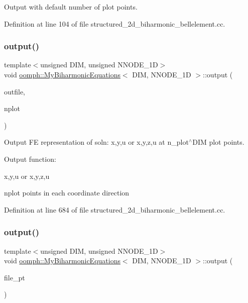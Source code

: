 Output with default number of plot points. 



Definition at line 104 of file structured\+\_\+2d\+\_\+biharmonic\+\_\+bellelement.\+cc.

\mbox{\label{classoomph_1_1MyBiharmonicEquations_a9a2734695e94f83eb6d553a7090dbebd}} 
\subsubsection{\texorpdfstring{output()}{output()}\hspace{0.1cm}{\footnotesize\ttfamily [2/4]}}
{\footnotesize\ttfamily template$<$unsigned D\+IM, unsigned N\+N\+O\+D\+E\+\_\+1D$>$ \\
void \hyperlink{classoomph_1_1MyBiharmonicEquations}{oomph\+::\+My\+Biharmonic\+Equations}$<$ D\+IM, N\+N\+O\+D\+E\+\_\+1D $>$\+::output (\begin{DoxyParamCaption}\item[{std\+::ostream \&}]{outfile,  }\item[{const unsigned \&}]{nplot }\end{DoxyParamCaption})}



Output FE representation of soln\+: x,y,u or x,y,z,u at n\+\_\+plot$^\wedge$\+D\+IM plot points. 

Output function\+:

x,y,u or x,y,z,u

nplot points in each coordinate direction 

Definition at line 684 of file structured\+\_\+2d\+\_\+biharmonic\+\_\+bellelement.\+cc.

\mbox{\label{classoomph_1_1MyBiharmonicEquations_a2ee8f210f50cf3b43f2b31b5e16b704f}} 
\subsubsection{\texorpdfstring{output()}{output()}\hspace{0.1cm}{\footnotesize\ttfamily [3/4]}}
{\footnotesize\ttfamily template$<$unsigned D\+IM, unsigned N\+N\+O\+D\+E\+\_\+1D$>$ \\
void \hyperlink{classoomph_1_1MyBiharmonicEquations}{oomph\+::\+My\+Biharmonic\+Equations}$<$ D\+IM, N\+N\+O\+D\+E\+\_\+1D $>$\+::output (\begin{DoxyParamCaption}\item[{F\+I\+LE $\ast$}]{file\+\_\+pt }\end{DoxyParamCaption})\hspace{0.3cm}{\ttfamily [inline]}}



